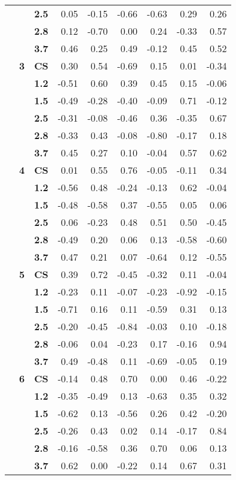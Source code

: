\begin{table}[htp]
\begin{center}
\begin{tabular}{>{\bfseries}c>{\bfseries}c>{\bfseries}crrrrrr}
 &  & 2.5 & 0.05 & -0.15 & -0.66 & -0.63 & 0.29 & 0.26\\
 &  & 2.8 & 0.12 & -0.70 & 0.00 & 0.24 & -0.33 & 0.57\\
 &  & 3.7 & 0.46 & 0.25 & 0.49 & -0.12 & 0.45 & 0.52\\\cmidrule{2-9}
 & 3 & CS & 0.30 & 0.54 & -0.69 & 0.15 & 0.01 & -0.34\\
 &  & 1.2 & -0.51 & 0.60 & 0.39 & 0.45 & 0.15 & -0.06\\
 &  & 1.5 & -0.49 & -0.28 & -0.40 & -0.09 & 0.71 & -0.12\\
 &  & 2.5 & -0.31 & -0.08 & -0.46 & 0.36 & -0.35 & 0.67\\
 &  & 2.8 & -0.33 & 0.43 & -0.08 & -0.80 & -0.17 & 0.18\\
 &  & 3.7 & 0.45 & 0.27 & 0.10 & -0.04 & 0.57 & 0.62\\\cmidrule{2-9}
 & 4 & CS & 0.01 & 0.55 & 0.76 & -0.05 & -0.11 & 0.34\\
 &  & 1.2 & -0.56 & 0.48 & -0.24 & -0.13 & 0.62 & -0.04\\
 &  & 1.5 & -0.48 & -0.58 & 0.37 & -0.55 & 0.05 & 0.06\\
 &  & 2.5 & 0.06 & -0.23 & 0.48 & 0.51 & 0.50 & -0.45\\
 &  & 2.8 & -0.49 & 0.20 & 0.06 & 0.13 & -0.58 & -0.60\\
 &  & 3.7 & 0.47 & 0.21 & 0.07 & -0.64 & 0.12 & -0.55\\\cmidrule{2-9}
 & 5 & CS & 0.39 & 0.72 & -0.45 & -0.32 & 0.11 & -0.04\\
 &  & 1.2 & -0.23 & 0.11 & -0.07 & -0.23 & -0.92 & -0.15\\
 &  & 1.5 & -0.71 & 0.16 & 0.11 & -0.59 & 0.31 & 0.13\\
 &  & 2.5 & -0.20 & -0.45 & -0.84 & -0.03 & 0.10 & -0.18\\
 &  & 2.8 & -0.06 & 0.04 & -0.23 & 0.17 & -0.16 & 0.94\\
 &  & 3.7 & 0.49 & -0.48 & 0.11 & -0.69 & -0.05 & 0.19\\\cmidrule{2-9}
 & 6 & CS & -0.14 & 0.48 & 0.70 & 0.00 & 0.46 & -0.22\\
 &  & 1.2 & -0.35 & -0.49 & 0.13 & -0.63 & 0.35 & 0.32\\
 &  & 1.5 & -0.62 & 0.13 & -0.56 & 0.26 & 0.42 & -0.20\\
 &  & 2.5 & -0.26 & 0.43 & 0.02 & 0.14 & -0.17 & 0.84\\
 &  & 2.8 & -0.16 & -0.58 & 0.36 & 0.70 & 0.06 & 0.13\\
 &  & 3.7 & 0.62 & 0.00 & -0.22 & 0.14 & 0.67 & 0.31\\
\bottomrule
\end{tabular}
\end{center}
\end{table}

